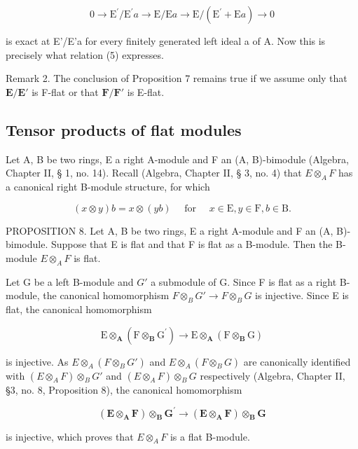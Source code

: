 \[
0 \rightarrow \mathrm{E} ^ {\prime} / \mathrm{E} ^ {\prime} a \rightarrow \mathrm{E} / \mathrm{E} a \rightarrow \mathrm{E} / (\mathrm{E} ^ {\prime} + \mathrm{E} a) \rightarrow 0
\]

is exact at E'/E'a for every finitely generated left ideal a of A. Now this is precisely what relation (5) expresses.

Remark 2. The conclusion of Proposition 7 remains true if we assume only that \(\mathbf{E} / \mathbf{E}'\) is F-flat or that \(\mathbf{F} / \mathbf{F}'\) is E-flat.

\subsection{Tensor products of flat modules}

Let A, B be two rings, E a right A-module and F an (A, B)-bimodule (Algebra, Chapter II, § 1, no. 14). Recall (Algebra, Chapter II, § 3, no. 4) that \(E \otimes_{A} F\) has a canonical right B-module structure, for which

\[
(x \otimes y) b = x \otimes (y b) \quad \text {   for   } \quad x \in \mathrm{E}, y \in \mathrm{F}, b \in \mathrm{B}.
\]

PROPOSITION 8. Let A, B be two rings, E a right A-module and F an (A, B)-bimodule. Suppose that E is flat and that F is flat as a B-module. Then the B-module \(E \otimes_{A} F\) is flat.

Let G be a left B-module and \(G'\) a submodule of G. Since F is flat as a right B-module, the canonical homomorphism \(F \otimes_{B} G' \to F \otimes_{B} G\) is injective. Since E is flat, the canonical homomorphism

\[
\mathrm{E} \otimes_ {\mathbf {A}} (\mathrm{F} \otimes_ {\mathbf {B}} \mathrm{G} ^ {\prime}) \rightarrow \mathrm{E} \otimes_ {\mathbf {A}} (\mathrm{F} \otimes_ {\mathbf {B}} \mathrm{G})
\]

is injective. As \(E \otimes_{A} (F \otimes_{B} G')\) and \(E \otimes_{A} (F \otimes_{B} G)\) are canonically identified with \((E \otimes_{A} F) \otimes_{B} G'\) and \((E \otimes_{A} F) \otimes_{B} G\) respectively (Algebra, Chapter II, §3, no. 8, Proposition 8), the canonical homomorphism

\[
(\mathbf {E} \otimes_ {\mathbf {A}} \mathbf {F}) \otimes_ {\mathbf {B}} \mathbf {G} ^ {\prime} \rightarrow (\mathbf {E} \otimes_ {\mathbf {A}} \mathbf {F}) \otimes_ {\mathbf {B}} \mathbf {G}
\]

is injective, which proves that \(E \otimes_{A} F\) is a flat B-module.

